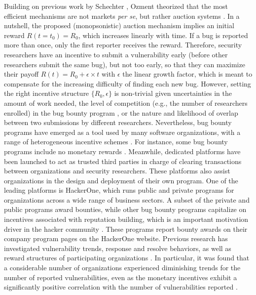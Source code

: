 Building on previous work by Schechter \cite{schechter2002buy}, Ozment \cite{ozment2004bug} theorized that the most efficient mechanisms are not markets {\it per se}, but rather auction systems \cite{milgrom1982theory}. In a nutshell, the proposed (monopsonistic) auction mechanism implies an initial reward $R(t=t_0) = R_0$, which increases linearly with time. If a bug is reported more than once, only the first reporter receives the reward. Therefore, security researchers have an incentive to submit a vulnerability early (before other researchers submit the same bug), but not too early, so that they can maximize their payoff $R(t) = R_0 + \epsilon \times t$ with $\epsilon$ the linear growth factor, which is meant to compensate for the increasing difficulty of finding each new bug. However, setting the right incentive structure $\{R_0,\epsilon \}$ is non-trivial given uncertainties in the amount of work needed, the level of competition (e.g., the number of researchers enrolled) in the bug bounty program \cite{pandey2014assessment}, or the nature and likelihood of overlap between two submissions by different researchers. Nevertheless, bug bounty programs have emerged as a tool used by many software organizations, with a range of heterogeneous incentive schemes \cite{finifter2013empirical}. For instance, some bug bounty programs include no monetary rewards \cite{zhao2014exploratory}. Meanwhile, dedicated platforms have been launched to act as trusted third parties in charge of clearing transactions between organizations and security researchers. These platforms also assist organizations in the design and deployment of their own program. One of the leading platforms is HackerOne, which runs public and private programs for organizations across a wide range of business sectors. A subset of the private and public programs award bounties, while other bug bounty programs capitalize on incentives associated with reputation building, which is an important motivation driver in the hacker community \cite{lakhani2005htu}. These programs report bounty awards on their company program pages on the HackerOne website. Previous research has investigated vulnerability trends, response and resolve behaviors, as well as reward structures of participating organizations \cite{zhao2014exploratory,zhao2015empirical}. In particular, it was found that a considerable number of organizations experienced diminishing trends for the number of reported vulnerabilities, even as the monetary incentives exhibit a significantly positive correlation with the number of vulnerabilities reported \cite{zhao2015empirical}.


